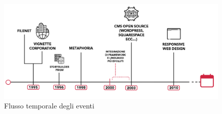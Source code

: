\begin{figure}[ht!]
    \centering
    \includegraphics[width=140mm]{images/Storyline.png}
    \caption{Flusso temporale degli eventi\label{overflow}}
\end{figure}

